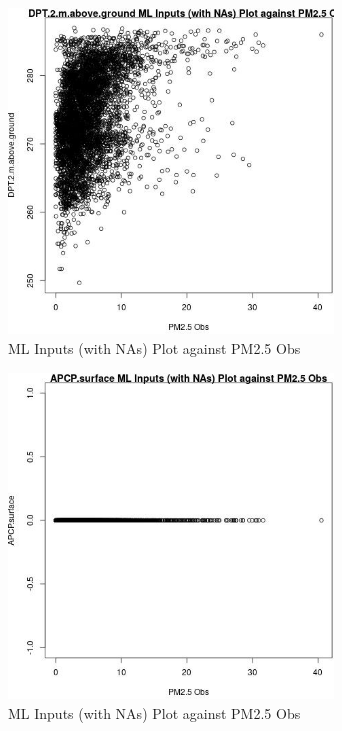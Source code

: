 \begin{figure} 
\centering  
\includegraphics[width=0.77\textwidth]{Code_Outputs/Report_ML_input_PM25_Step4_part_e_de_duplicated_aveswNAs_DPT2mabovegroundvPM25_Obs.jpg} 
\caption{\label{fig:Report_ML_input_PM25_Step4_part_e_de_duplicated_aveswNAsDPT2mabovegroundvPM25_Obs}ML Inputs (with NAs) Plot against PM2.5 Obs} 
\end{figure} 
 

\begin{figure} 
\centering  
\includegraphics[width=0.77\textwidth]{Code_Outputs/Report_ML_input_PM25_Step4_part_e_de_duplicated_aveswNAs_APCPsurfacevPM25_Obs.jpg} 
\caption{\label{fig:Report_ML_input_PM25_Step4_part_e_de_duplicated_aveswNAsAPCPsurfacevPM25_Obs}ML Inputs (with NAs) Plot against PM2.5 Obs} 
\end{figure} 
 

